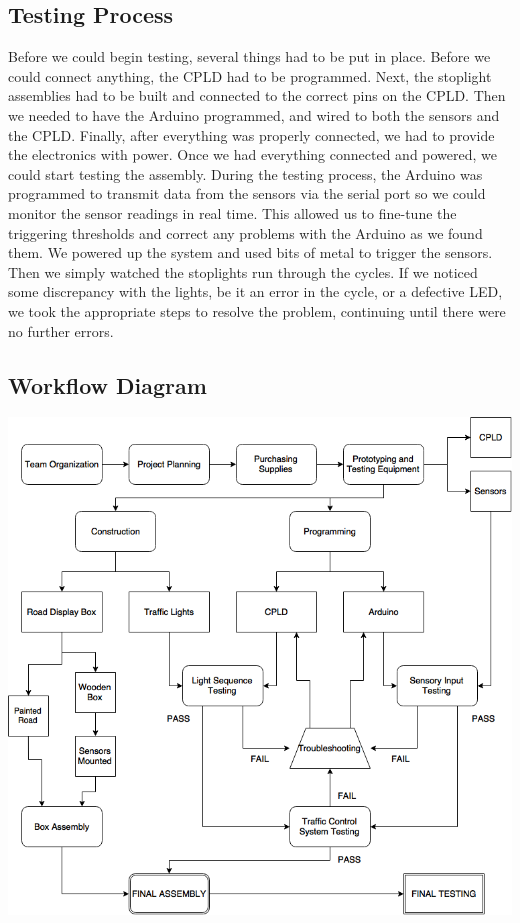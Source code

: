 \subsection{Testing Process}
Before we could begin testing, several things had to be put in place. Before we could connect anything, the CPLD had to be programmed.
Next, the stoplight assemblies had to be built and connected to the correct pins on the CPLD.
Then we needed to have the Arduino programmed, and wired to both the sensors and the CPLD.
Finally, after everything was properly connected, we had to provide the electronics with power.
Once we had everything connected and powered, we could start testing the assembly. During the testing process, the Arduino was programmed to
transmit data from the sensors via the serial port so we could monitor the sensor readings in real time.
This allowed us to fine-tune the triggering thresholds and correct any problems with the Arduino as we found them.
We powered up the system and used bits of metal to trigger the sensors. Then we simply watched the stoplights run through the cycles. If we noticed
some discrepancy with the lights, be it an error in the cycle, or a defective LED, we took the appropriate steps to resolve the problem,
continuing until there were no further errors.
\subsection{Workflow Diagram}
\includegraphics[scale=0.6]{DIGITALFLOW.png}